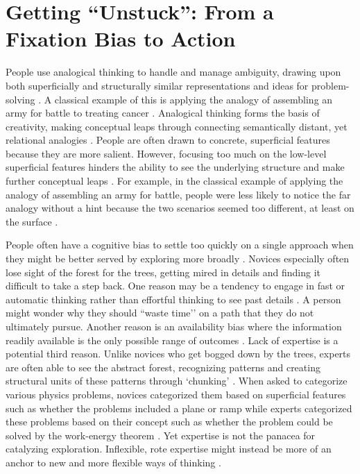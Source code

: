 \section{Getting ``Unstuck'': From a Fixation Bias to Action}
People use analogical thinking to handle and manage ambiguity, drawing upon both superficially and structurally similar representations and ideas for problem-solving \cite{gentner1983structure, Gentner2010, gick1980analogical, tversky1973availability, vanlehn1998analogy}. A classical example of this is applying the analogy of assembling an army for battle to treating cancer \cite{duncker1945problem, gick1980analogical}. Analogical thinking forms the basis of creativity, making conceptual leaps through connecting semantically distant, yet relational analogies \cite{chan2011benefits, gentner1997analogy, gentner2003learning, Green2016, vendetti2014far}. People are often drawn to concrete,  superficial features because they are more salient. However, focusing too much on the low-level superficial features hinders the ability to see the underlying structure and make further conceptual leaps  \cite{gentner1983structure, gick1980analogical, lucas2014children, vendetti2014far}. For example, in the classical example of applying the analogy of assembling an army for battle, people were less likely to notice the far analogy without a hint because the two scenarios seemed too different, at least on the surface \cite{gick1980analogical}. 

People often have a cognitive bias to settle too quickly on a single approach when they might be better served by exploring more broadly \cite{jansson1991design, kershaw2004, Ohlsson1992, simon1972theories}. Novices especially often lose sight of the forest for the trees, getting mired in details and finding it difficult to take a step back. One reason may be a tendency to engage in fast or automatic thinking rather than effortful thinking to see past details \cite{allen2011dual, kahneman2011thinking}. A person might wonder why they should ``waste time’’ on a path that they do not ultimately pursue. Another reason is an availability bias where the information readily available is the only possible range of outcomes \cite{tversky1973availability}. Lack of expertise is a potential third reason. Unlike novices who get bogged down by the trees, experts are often able to see the abstract forest, recognizing patterns and creating structural units of these patterns through `chunking’ \cite{Chase1973, chi1981categorization, ericsson2018cambridge, Gobet2001,Gobet1998}. When asked to categorize various physics problems, novices categorized them based on superficial features such as whether the problems included a plane or ramp while experts categorized these problems based on their concept such as whether the problem could be solved by the work-energy theorem \cite{chi2012seeing,chi1981categorization}. Yet expertise is not the panacea for catalyzing exploration. Inflexible, rote expertise might instead be more of an anchor to new and more flexible ways of thinking \cite{hinds1999curse, hinds2001, wiley1998expertise}. 

